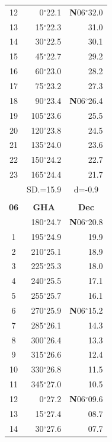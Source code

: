 \documentclass[10pt, a4paper]{report}
\begin{document}
\begin{scriptsize}
\begin{tabular*}{0.2\textwidth}[t]{@{\extracolsep{\fill}}|c|rr|}
12 & 0$^\circ$22.1 & \textbf{N}06$^\circ$32.0\\
13 & 15$^\circ$22.3 & 31.0\\
14 & 30$^\circ$22.5 & 30.1\\
15 & 45$^\circ$22.7 & \raisebox{0.24ex}{\boldmath$\cdot$~\boldmath$\cdot$~~}29.2\\
16 & 60$^\circ$23.0 & 28.2\\
17 & 75$^\circ$23.2 & 27.3\\[2Pt]
18 & 90$^\circ$23.4 & \textbf{N}06$^\circ$26.4\\
19 & 105$^\circ$23.6 & 25.5\\
20 & 120$^\circ$23.8 & 24.5\\
21 & 135$^\circ$24.0 & \raisebox{0.24ex}{\boldmath$\cdot$~\boldmath$\cdot$~~}23.6\\
22 & 150$^\circ$24.2 & 22.7\\
23 & 165$^\circ$24.4 & 21.7\\
\hline
\rule{0pt}{2.4ex} & \multicolumn{1}{c}{SD.=15.9} & \multicolumn{1}{c|}{d=-0.9}\\
\hline
\multicolumn{1}{c}{}\\[-0.5ex]\hline
\multicolumn{1}{|c|}{\rule{0pt}{2.6ex}\textbf{06}} & \multicolumn{1}{c}{\textbf{GHA}} & \multicolumn{1}{c|}{\textbf{Dec}}\\
\hline\rule{0pt}{2.6ex}\noindent
0 & 180$^\circ$24.7 & \textbf{N}06$^\circ$20.8\\
1 & 195$^\circ$24.9 & 19.9\\
2 & 210$^\circ$25.1 & 18.9\\
3 & 225$^\circ$25.3 & \raisebox{0.24ex}{\boldmath$\cdot$~\boldmath$\cdot$~~}18.0\\
4 & 240$^\circ$25.5 & 17.1\\
5 & 255$^\circ$25.7 & 16.1\\[2Pt]
6 & 270$^\circ$25.9 & \textbf{N}06$^\circ$15.2\\
7 & 285$^\circ$26.1 & 14.3\\
8 & 300$^\circ$26.4 & 13.3\\
9 & 315$^\circ$26.6 & \raisebox{0.24ex}{\boldmath$\cdot$~\boldmath$\cdot$~~}12.4\\
10 & 330$^\circ$26.8 & 11.5\\
11 & 345$^\circ$27.0 & 10.5\\[2Pt]
12 & 0$^\circ$27.2 & \textbf{N}06$^\circ$09.6\\
13 & 15$^\circ$27.4 & 08.7\\
14 & 30$^\circ$27.6 & 07.7\\

\end{tabular*}
\end{scriptsize}
\end{document}
